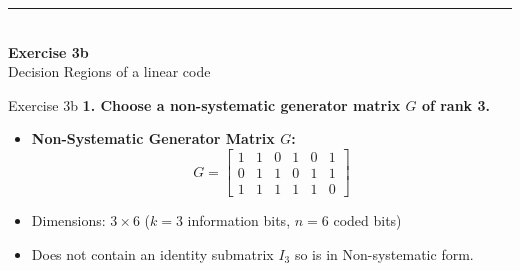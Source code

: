 \documentclass[10pt, aspectratio=169]{beamer}
\newcommand{\question}[1]{{\color{QuestionRed}\textbf{#1}}}
\begin{document}
\begin{frame}[plain]
  \vfill
  \centering
  {\color{TealAccent}\rule{2cm}{2pt}}\\[0.4cm]
  {\LARGE\bfseries\color{NavyPrimary} Exercise 3b}\\[0.2cm]
  {\large\color{SlateNeutral} Decision Regions of a linear code}
  \vfill
\end{frame}

\begin{frame}{Exercise 3b}
  \question{1. Choose a non-systematic generator matrix $G$ of rank 3.}

  \vspace{0.2cm}
  \begin{itemize}
    \item \textbf{Non-Systematic Generator Matrix $G$:}
    \[
      G = \begin{bmatrix}
        1 & 1 & 0 & 1 & 0 & 1 \\
        0 & 1 & 1 & 0 & 1 & 1 \\
        1 & 1 & 1 & 1 & 1 & 0
      \end{bmatrix}
    \]
    \item Dimensions: $3 \times 6$ ($k = 3$ information bits, $n = 6$ coded bits)
    \item Does not contain an identity submatrix $I_3$ so is in Non-systematic form.
  \end{itemize}
\end{frame}
\end{document}
